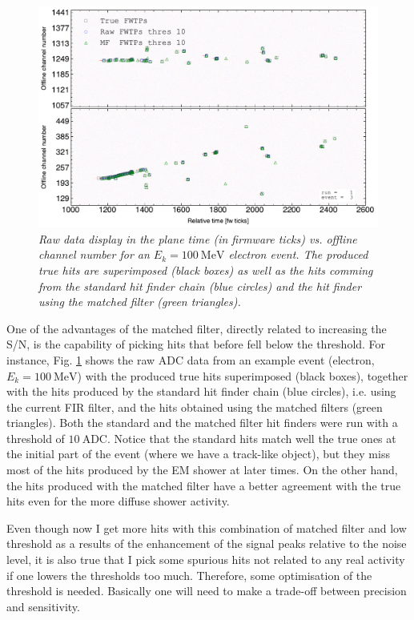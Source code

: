 \begin{figure}
	\centering
	\includegraphics[width=0.9\linewidth]{Images/Matched_Filter/electron_k100_full_run_1_evt_3}
	\caption{\textit{Raw data display in the plane time (in firmware ticks) vs. offline channel number for an $E_{k} = 100 \ \mathrm{MeV}$ electron event. The produced true hits are superimposed (black boxes) as well as the hits comming from the standard hit finder chain (blue circles) and the hit finder using the matched filter (green triangles).}}
	\label{fig:evthitcomp}
\end{figure}

One of the advantages of the matched filter, directly related to increasing the S/N, is the capability of picking hits that before fell below the threshold. For instance, Fig. \ref{fig:evthitcomp} shows the raw ADC data from an example event (electron, $E_{k} = 100 \ \mathrm{MeV}$) with the produced true hits superimposed (black boxes), together with the hits produced by the standard hit finder chain (blue circles), i.e. using the current FIR filter, and the hits obtained using the matched filters (green triangles). Both the standard and the matched filter hit finders were run with a threshold of $10 \ \mathrm{ADC}$. Notice that the standard hits match well the true ones at the initial part of the event (where we have a track-like object), but they miss most of the hits produced by the EM shower at later times. On the other hand, the hits produced with the matched filter have a better agreement with the true hits even for the more diffuse shower activity.

Even though now I get more hits with this combination of matched filter and low threshold as a results of the enhancement of the signal peaks relative to the noise level, it is also true that I pick some spurious hits not related to any real activity if one lowers the thresholds too much. Therefore, some optimisation of the threshold is needed. Basically one will need to make a trade-off between precision and sensitivity.

